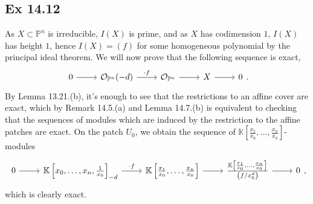 \documentclass{article}
\theoremstyle{definition}
\newcommand{\K}{\mathbb{K}}
\renewcommand{\P}{\mathbb{P}}
\newcommand{\Pn}{\P^n}
\newcommand{\oo}{\mathcal{O}}
\begin{document}
\subsection*{Ex 14.12}

As $X \subset \Pn$ is irreducible, $I(X)$ is prime, and as $X$ has codimension
$1$, $I(X)$ has height $1$, hence $I(X) = (f)$ for some homogeneous polynomial
by the principal ideal theorem. We will now prove that the following sequence
is exact,
\[
	\begin{tikzcd}
	0
	\ar{r}
	& \oo_{\Pn}(-d)
	\ar{r}{\cdot f}
	& \oo_{\Pn}
	\ar{r}
	& X
	\ar{r}
	& 0
	\end{tikzcd}.
\] 
By Lemma 13.21.(b), it's enough to see that the restrictions to an affine cover
are exact, which by Remark 14.5.(a) and Lemma 14.7.(b) is equivalent to
checking that the sequences of modules which are induced by the restriction to
the affine patches are exact. On the patch $U_0$, we obtain the sequence of
$\K\left[\frac{x_1}{x_0}, \ldots, \frac{x_n}{x_0}\right]$-modules
\[
	\begin{tikzcd}
		0
		\ar{r}
		& \K\left[x_0, \ldots, x_n, \frac{1}{x_0}\right]_{-d}
		\ar{r}{\cdot f}
		& \K\left[\frac{x_1}{x_0}, \ldots, \frac{x_n}{x_0}\right]
		\ar{r}
		& \frac{\K\left[\frac{x_1}{x_0}, \ldots, \frac{x_n}{x_0}\right]}{\left( f/x_0^{d} \right)}
		\ar{r}
		& 
		0
	\end{tikzcd},
\] 
which is clearly exact.
\end{document}
